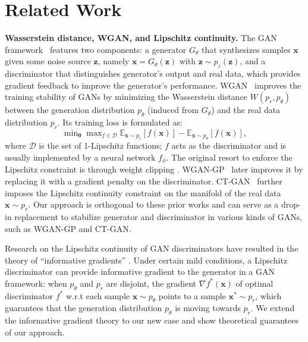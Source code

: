 \documentclass{article}
\newcommand{\0}{\bm{0}}
\newcommand{\xm}{\bm{x}}
\newcommand{\EE}{\mathbb{E}}
\newcommand{\x}{\bm{x}}
\begin{document}
\section{Related Work}\label{sec:related}


\textbf{Wasserstein distance, WGAN, and Lipschitz continuity.} 
The GAN framework~\cite{goodfellow2014generative} features two components: a generator $G_\theta$ that synthesizes samples $\x$ given some noise source $\bm{z}$, namely $\x=G_\theta(\bm{z})$ with $\bm{z}\sim p_z(\bm{z})$, and a discriminator that distinguishes generator’s output and real data, which provides gradient feedback to improve the generator's performance. WGAN~\cite{WGAN} improves the training stability of GANs by minimizing the Wasserstein distance $W(p_r, p_\theta)$ between the generation distribution $p_\theta$ (induced from $G_\theta$) and the real data distribution $p_r$.
Its training loss is formulated as:
\begin{equation}
\min\nolimits_{\bm{\theta}} \max\nolimits_{f \in\mathcal{D}} \EE_{\xm\sim p_r}[f(\x)] - \EE_{\xm\sim p_\theta}[f(\x)],
\label{eq:related:wgan}
\end{equation}
where $\mathcal{D}$ is the set of 1-Lipschitz functions; $f$ acts as the discriminator and is usually implemented by a neural network $f_\phi$.
The original resort to enforce the Lipschitz constraint is through weight clipping \cite{WGAN}. WGAN-GP~\cite{wgangp} later improves it by  replacing it with a gradient penalty on the discriminator. CT-GAN~\cite{wwgan} further imposes the Lipschitz continuity constraint on  the manifold of the real data $\xm \sim p_r$. Our approach is orthogonal to these prior works and can serve as a drop-in replacement to stabilize generator and discriminator in various kinds of GANs, such as WGAN-GP and CT-GAN.






Research on the Lipschitz continuity of GAN discriminators have resulted in the theory of ``informative gradients'' \cite{lipschitz,zhou2018understanding}. Under certain mild conditions, a Lipschitz discriminator can provide informative gradient to the generator in a GAN framework: when $p_\theta$ and $p_r$ are disjoint, the gradient $\nabla f^*(\xm)$ of optimal discriminator $f^*$ w.r.t each sample $\xm\sim p_\theta$ points to a sample $\x^* \sim p_r$, which guarantees that the generation distribution $p_{\theta}$ is moving towards $p_r$. We extend the informative gradient theory to our new case and show theoretical guarantees of our approach.
\end{document}
